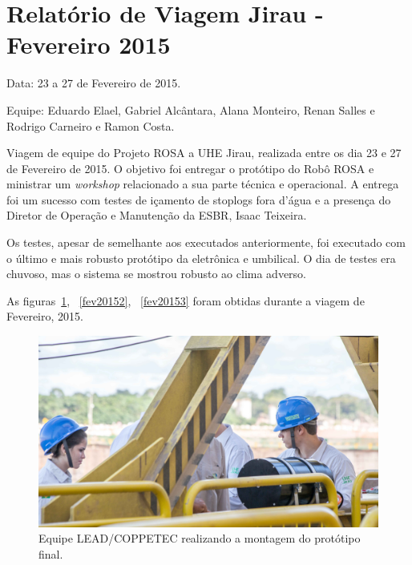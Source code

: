 \section{Relatório de Viagem Jirau - Fevereiro 2015}
Data: 23 a 27 de Fevereiro de 2015.

Equipe: Eduardo Elael, Gabriel Alcântara, Alana Monteiro, Renan Salles e Rodrigo Carneiro e Ramon Costa.


Viagem de equipe do Projeto ROSA a UHE Jirau, realizada entre
os dia 23 e 27 de Fevereiro de 2015. O objetivo foi entregar o protótipo do Robô
ROSA e ministrar um \textit{workshop} relacionado a sua parte técnica e
operacional. A entrega foi um sucesso com testes de içamento de stoplogs fora
d'água e a presença do Diretor de Operação e Manutenção da ESBR, Isaac Teixeira.

Os testes, apesar de semelhante aos executados anteriormente, foi executado com
o último e mais robusto protótipo da eletrônica e umbilical. O dia de testes era
chuvoso, mas o sistema se mostrou robusto ao clima adverso. 

As figuras~\ref{fev20151}, ~\ref{fev20152}, ~\ref{fev20153} foram obtidas durante a viagem
de Fevereiro, 2015. 

\begin{figure}[h!]
\centering
  \includegraphics[width=1\linewidth]{Fotos/Fevereiro2015/fev20151.jpg}
  \caption{Equipe LEAD/COPPETEC realizando a montagem do protótipo final.}
  \label{fev20151}
\end{figure}

